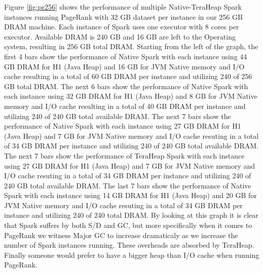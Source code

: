 Figure \ref{fig:pr256} shows the performance of multiple Native-TeraHeap
Spark instances running PageRank with 32 GB dataset per instance in
our 256 GB DRAM machine. Each instance of Spark uses one executor with
8 cores per executor. Available DRAM is 240 GB and 16 GB are left to
the Operating system, resulting in 256 GB total DRAM. Starting from
the left of the graph, the first 4 bars show the performance of Native
Spark with each instance using 44 GB DRAM for H1 (Java Heap) and 16 GB
for JVM Native memory and I/O cache resulting in a total of 60 GB DRAM
per instance and utilizing 240 of 256 GB total DRAM. The next 6 bars
show the performance of Native Spark with each instance using 32 GB
DRAM for H1 (Java Heap) and 8 GB for JVM Native memory and I/O cache
resulting in a total of 40 GB DRAM per instance and utilizing 240 of
240 GB total available DRAM. The next 7 bars show the performance of
Native Spark with each instance using 27 GB DRAM for H1 (Java Heap)
and 7 GB for JVM Native memory and I/O cache resuting in a total of 34
GB DRAM per instance and utilizing 240 of 240 GB total available DRAM.
The next 7 bars show the performance of TeraHeap Spark with each
instance using 27 GB DRAM for H1 (Java Heap) and 7 GB for JVM Native
memory and I/O cache resuting in a total of 34 GB DRAM per instance
and utilizing 240 of 240 GB total available DRAM. The last 7 bars show
the performance of Native Spark with each instance using 14 GB DRAM
for H1 (Java Heap) and 20 GB for JVM Native memory and I/O cache
resuting in a total of 34 GB DRAM per instance and utilizing 240 of
240 total DRAM. By looking at this graph it is clear that Spark
suffers by both S/D and GC, but more specifically when it comes to
PageRank we witness Major GC to increase dramaticaly as we increase
the number of Spark instances running. These overheads are absorbed by
TeraHeap. Finally someone would prefer to have a bigger heap than I/O
cache when running PageRank.

